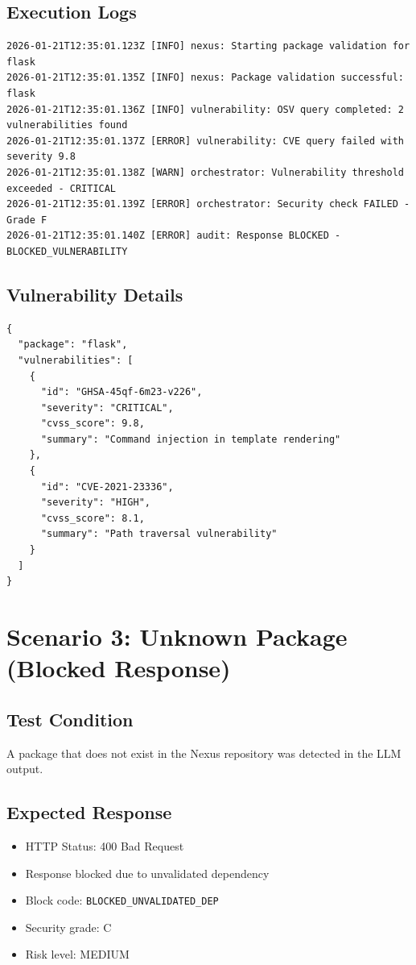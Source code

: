 \documentclass[11pt, a4paper]{article}
\begin{document}
\subsection{Execution Logs}
\begin{lstlisting}[style=logstyle]
2026-01-21T12:35:01.123Z [INFO] nexus: Starting package validation for flask
2026-01-21T12:35:01.135Z [INFO] nexus: Package validation successful: flask
2026-01-21T12:35:01.136Z [INFO] vulnerability: OSV query completed: 2 vulnerabilities found
2026-01-21T12:35:01.137Z [ERROR] vulnerability: CVE query failed with severity 9.8
2026-01-21T12:35:01.138Z [WARN] orchestrator: Vulnerability threshold exceeded - CRITICAL
2026-01-21T12:35:01.139Z [ERROR] orchestrator: Security check FAILED - Grade F
2026-01-21T12:35:01.140Z [ERROR] audit: Response BLOCKED - BLOCKED_VULNERABILITY
\end{lstlisting}

\subsection{Vulnerability Details}
\begin{lstlisting}[style=jsonstyle]
{
  "package": "flask",
  "vulnerabilities": [
    {
      "id": "GHSA-45qf-6m23-v226",
      "severity": "CRITICAL",
      "cvss_score": 9.8,
      "summary": "Command injection in template rendering"
    },
    {
      "id": "CVE-2021-23336",
      "severity": "HIGH",
      "cvss_score": 8.1,
      "summary": "Path traversal vulnerability"
    }
  ]
}
\end{lstlisting}

\section{Scenario 3: Unknown Package (Blocked Response)}

\subsection{Test Condition}
A package that does not exist in the Nexus repository was detected in the LLM output.

\subsection{Expected Response}
\begin{itemize}
    \item HTTP Status: 400 Bad Request
    \item Response blocked due to unvalidated dependency
    \item Block code: \texttt{BLOCKED\_UNVALIDATED\_DEP}
    \item Security grade: C
    \item Risk level: MEDIUM
\end{itemize}
\end{document}
